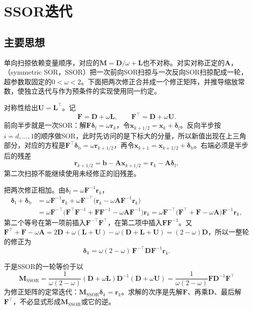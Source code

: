 \section{SSOR迭代}
\label{sec:ls-ssor}

\subsection{主要思想}

单向扫掠依赖变量顺序，对应的$\bm M=\bm D/\omega+\bm L$也不对称。对实对称正定的$\bm A$，（symmetric SOR，SSOR）把一次前向SOR扫掠与一次反向SOR扫掠配成一轮，超参数取固定的$0<\omega<2$。下面把两次修正合并成一个修正矩阵，并推导缩放常数，使独立迭代与作为预条件的实现使用同一约定。

对称性给出$\bm U=\bm L^\top$。记
\[
\bm F=\bm D+\omega\bm L,\qquad \bm F^\top=\bm D+\omega\bm U .
\]
前向半步就是一次SOR：解$\bm F\bm\delta_{\mathrm f}=\omega\bm r_k$，令$\bm x_{k+1/2}=\bm x_k+\bm\delta_{\mathrm f}$。反向半步按$i=d,\ldots,1$的顺序做SOR，此时先访问的是下标大的分量，所以新值出现在上三角部分，对应的方程是$\bm F^\top\bm\delta_{\mathrm b}=\omega\bm r_{k+1/2}$，再令$\bm x_{k+1}=\bm x_{k+1/2}+\bm\delta_{\mathrm b}$。右端必须是半步后的残差
\[
\bm r_{k+1/2}=\bm b-\bm A\bm x_{k+1/2}=\bm r_k-\bm A\bm\delta_{\mathrm f},
\]
第二次扫掠不能继续使用未经修正的旧残差。

把两次修正相加。由$\bm\delta_{\mathrm f}=\omega\bm F^{-1}\bm r_k$，
\[
\begin{aligned}
\bm\delta_{\mathrm f}+\bm\delta_{\mathrm b}
&=\omega\bm F^{-1}\bm r_k+\omega\bm F^{-\top}\bigl(\bm r_k-\omega\bm A\bm F^{-1}\bm r_k\bigr)\\
&=\omega\bm F^{-\top}\bigl(\bm F^\top\bm F^{-1}+\bm F\bm F^{-1}-\omega\bm A\bm F^{-1}\bigr)\bm r_k
=\omega\bm F^{-\top}\bigl(\bm F^\top+\bm F-\omega\bm A\bigr)\bm F^{-1}\bm r_k ,
\end{aligned}
\]
第二个等号在第一项前插入$\bm F^{-\top}\bm F^\top$，在第二项中插入$\bm F\bm F^{-1}$。又$\bm F^\top+\bm F-\omega\bm A=2\bm D+\omega(\bm L+\bm U)-\omega(\bm D+\bm L+\bm U)=(2-\omega)\bm D$，所以一整轮的修正为
\[
\bm\delta_k=\omega(2-\omega)\,\bm F^{-\top}\bm D\bm F^{-1}\bm r_k .
\]

于是SSOR的一轮等价于以
\[
\bm M_{\mathrm{SSOR}}=\frac{1}{\omega(2-\omega)}(\bm D+\omega\bm L)\bm D^{-1}(\bm D+\omega\bm U)
=\frac{1}{\omega(2-\omega)}\bm F\bm D^{-1}\bm F^\top
\]
为修正矩阵的定常迭代：$\bm M_{\mathrm{SSOR}}\bm\delta_k=\bm r_k$。求解的次序是先解$\bm F$、再乘$\bm D$、最后解$\bm F^\top$，不必显式形成$\bm M_{\mathrm{SSOR}}$或它的逆。

